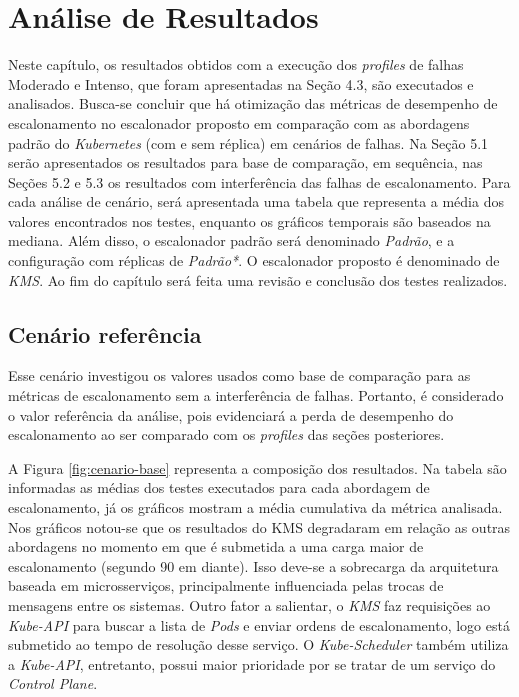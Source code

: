 \chapter{Análise de Resultados}
Neste capítulo, os resultados obtidos com a execução dos \textit{profiles} de falhas Moderado e Intenso, que foram apresentadas na Seção 4.3, são executados e analisados. Busca-se concluir que há otimização das métricas de desempenho de escalonamento no escalonador proposto em comparação com as abordagens padrão do \textit{Kubernetes} (com e sem réplica) em cenários de falhas. Na Seção 5.1 serão apresentados os resultados para base de comparação, em sequência, nas Seções 5.2 e 5.3 os resultados com interferência das falhas de escalonamento. Para cada análise de cenário, será apresentada uma tabela que representa a média dos valores encontrados nos testes, enquanto os gráficos temporais são baseados na mediana. Além disso, o escalonador padrão será denominado \textit{Padrão}, e a configuração com réplicas de \textit{Padrão*}. O escalonador proposto é denominado de \textit{KMS}. Ao fim do capítulo será feita uma revisão e conclusão dos testes realizados.

\section{Cenário referência}

Esse cenário investigou os valores usados como base de comparação para as métricas de escalonamento sem a interferência de falhas. Portanto, é considerado o valor referência da análise, pois evidenciará a perda de desempenho do escalonamento ao ser comparado com os \textit{profiles} das seções posteriores.

A Figura \ref{fig:cenario-base} representa a composição dos resultados. Na tabela são informadas as médias dos testes executados para cada abordagem de escalonamento, já os gráficos mostram a média cumulativa da métrica analisada. Nos gráficos notou-se que os resultados do \ac{KMS} degradaram em relação as outras abordagens no momento em que é submetida a uma carga maior de escalonamento (segundo 90 em diante). Isso deve-se a sobrecarga da arquitetura baseada em microsserviços, principalmente influenciada pelas trocas de mensagens entre os sistemas. Outro fator a salientar, o \textit{KMS} faz requisições ao \textit{Kube-API} para buscar a lista de \textit{Pods} e enviar ordens de escalonamento, logo está submetido ao tempo de resolução desse serviço. O \textit{Kube-Scheduler} também utiliza a \textit{Kube-API}, entretanto, possui maior prioridade por se tratar de um serviço do \textit{Control Plane}.


